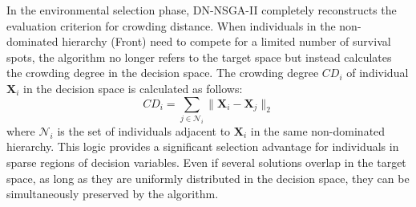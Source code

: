 \par In the environmental selection phase, DN-NSGA-II completely reconstructs the evaluation criterion for crowding distance. When individuals in the non-dominated hierarchy (Front) need to compete for a limited number of survival spots, the algorithm no longer refers to the target space but instead calculates the crowding degree in the decision space. The crowding degree $CD_i$ of individual $\mathbf{X}_i$ in the decision space is calculated as follows: 
\begin{equation}
	CD_i = \sum_{j \in \mathcal{N}_i} \|\mathbf{X}_i - \mathbf{X}_j\|_2
\end{equation}
where $\mathcal{N}_i$ is the set of individuals adjacent to $\mathbf{X}_i$ in the same non-dominated hierarchy. This logic provides a significant selection advantage for individuals in sparse regions of decision variables. Even if several solutions overlap in the target space, as long as they are uniformly distributed in the decision space, they can be simultaneously preserved by the algorithm.
